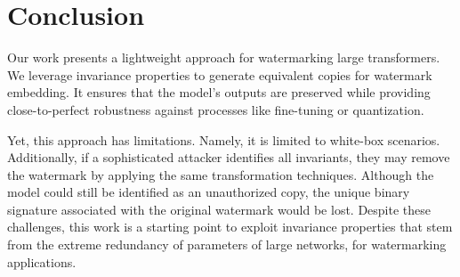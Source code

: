 

\section{Conclusion}

Our work presents a lightweight approach for watermarking large transformers. 
We leverage invariance properties to generate equivalent copies for watermark embedding. 
It ensures that the model's outputs are preserved while providing close-to-perfect robustness against processes like fine-tuning or quantization. 

Yet, this approach has limitations. 
Namely, it is limited to white-box scenarios. 
Additionally, if a sophisticated attacker identifies all invariants, they may remove the watermark by applying the same transformation techniques. 
Although the model could still be identified as an unauthorized copy, the unique binary signature associated with the original watermark would be lost.
Despite these challenges, this work is a starting point to exploit invariance properties that stem from the extreme redundancy of parameters of large networks, for watermarking applications.
